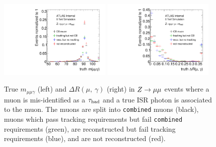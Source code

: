 \begin{figure}[tp]
  \centering
  \includegraphics[width=0.48\textwidth]{figures/tauperformance/muonfakes_mlly}
  \includegraphics[width=0.48\textwidth]{figures/tauperformance/muonfakes_dR}
  \caption{True $m_{\mu\mu\gamma}$ (left) and $\Delta R(\mu,\ \gamma)$ (right) in $Z \rightarrow \mu\mu$ events where a muon is mis-identified as a $\tau_\text{had}$ and a true ISR photon is associated to the muon. The muons are split into \texttt{combined} muons (black), muons which pass tracking requirements but fail \texttt{combined} requirements (green), are reconstructed but fail tracking requirements (blue), and are not reconstructed (red).}
  \label{fig:taus-muonfakes2}
\end{figure}


